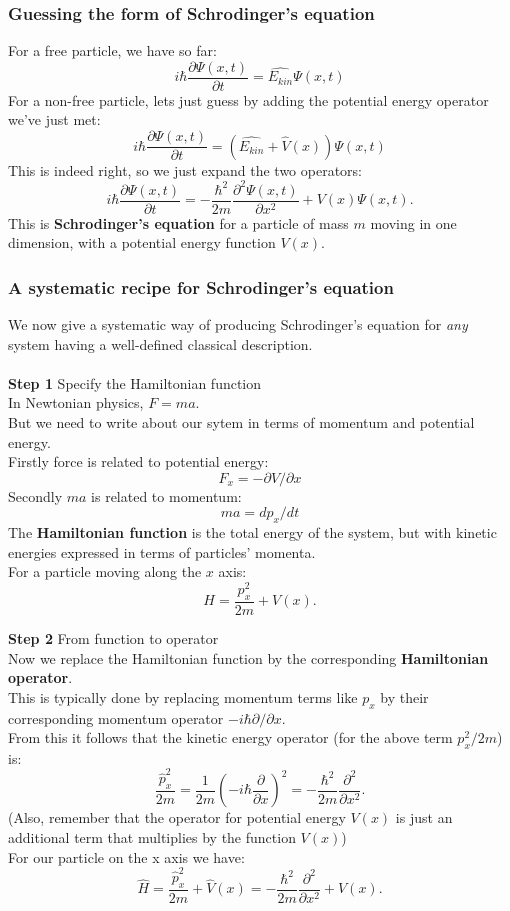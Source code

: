 \documentclass{article}
\begin{document}
\subsubsection{Guessing the form of Schrodinger's equation}
For a free particle, we have so far:
$$ i\hbar \frac{\partial\Psi(x,t)}
               {\partial t}       = \hat{E_{kin}}\Psi(x,t) $$
For a non-free particle, lets just guess by adding the potential energy operator we've just met:
$$ i\hbar \frac{\partial\Psi(x,t)}
               {\partial t}       = (\hat{E_{kin}} + \hat{V}(x))\Psi(x,t) $$
This is indeed right, so we just expand the two operators:
$$ i\hbar \frac{\partial\Psi(x,t)}
               {\partial t}       = - \frac{\hbar^2}{2m} \frac{\partial^2\Psi(x,t)}{\partial x^2} + V(x)\Psi(x,t).$$
This is \textbf{Schrodinger's equation} for a particle of mass $m$ moving in one dimension, with a potential energy function $V(x)$.

\subsubsection{A systematic recipe for Schrodinger's equation}
We now give a systematic way of producing Schrodinger's equation for \emph{any} system having a well-defined classical description.\\ \\

\textbf{Step 1} Specify the Hamiltonian function\\
In Newtonian physics, $F=ma$.\\
But we need to write about our sytem in terms of momentum and potential energy.\\
Firstly force is related to potential energy:
$$ F_x = -\partial V/\partial x $$
Secondly $ma$ is related to momentum:
$$ ma = dp_x/dt $$
The \textbf{Hamiltonian function} is the total energy of the system, but with kinetic energies expressed in terms of particles' momenta.\\
For a particle moving along the $x$ axis:
$$ H = \frac{p_x^2}{2m} + V(x). $$

\textbf{Step 2} From function to operator\\
Now we replace the Hamiltonian function by the corresponding \textbf{Hamiltonian operator}.\\
This is typically done by replacing momentum terms like $p_x$ by their corresponding momentum operator $-i\hbar\partial/\partial x$.\\
From this it follows that the kinetic energy operator (for the above term $p_x^2/2m$) is:
$$ \frac{\hat{p}_x^2}{2m} = \frac{1}{2m} \left( -i\hbar \frac{\partial}{\partial x}\right)^2
   = -\frac{\hbar^2}{2m} \frac{\partial^2}{\partial x^2}. $$
(Also, remember that the operator for potential energy $V(x)$ is just an additional term that multiplies by the function $V(x)$)\\
For our particle on the x axis we have:
$$ \hat{H} = \frac{\hat{p}_x^2}{2m} + \hat{V}(x) = -\frac{\hbar^2}{2m} \frac{\partial^2}{\partial x^2} + V(x). $$
\end{document}
